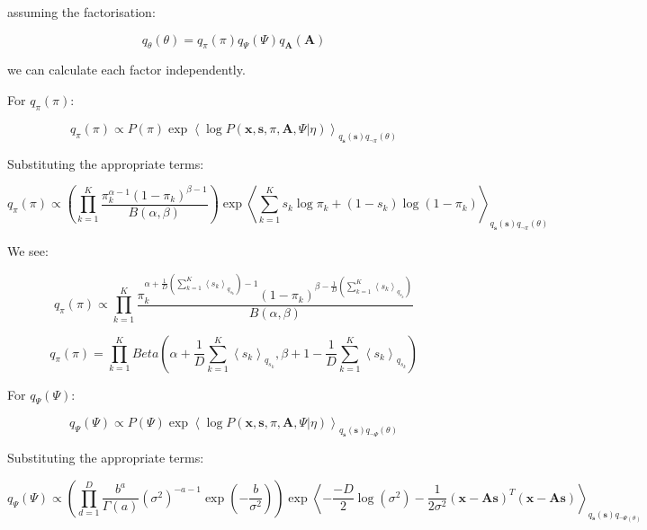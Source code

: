 \documentclass[12pt]{article}
\begin{document}
assuming the factorisation:

\[q_{\theta}(\theta) = q_{\pi}(\pi)q_{\Psi}(\Psi)q_{\textbf{A}}(\textbf{A})\]

we can calculate each factor independently.

For $q_{\pi}(\pi)$:

\[q_{\pi}(\pi) \propto P(\pi)\exp \left\langle \log P(\textbf{x}, \textbf{s}, \pi, \textbf{A}, \Psi | \eta) \right\rangle_{q_{\textbf{s}}(\textbf{s}) q_{\neg \pi}(\theta)}\]

Substituting the appropriate terms:

\[q_{\pi}(\pi) \propto \left(\prod_{k=1}^{K} \frac{\pi_k^{\alpha - 1}(1-\pi_k)^{\beta-1}}{B(\alpha, \beta)} \right)\exp \left\langle \sum_{k=1}^K s_k \log \pi_k + (1 - s_k) \log (1-\pi_k) \right\rangle_{q_{\textbf{s}}(\textbf{s}) q_{\neg \pi}(\theta)}\]

We see:

\[q_{\pi}(\pi) \propto \prod_{k=1}^{K} \frac{\pi_k^{\alpha  + \frac{1}{D}\left(\sum_{k=1}^K \left\langle s_k\right\rangle_{q_{s_k}}\right) - 1}(1-\pi_k)^{\beta-\frac{1}{D}\left(\sum_{k=1}^K \left\langle s_k\right\rangle_{q_{s_k}}\right)}}{B(\alpha, \beta)}\]

\[q_{\pi}(\pi) = \prod_{k=1}^{K}  Beta\left(\alpha + \frac{1}{D}\sum_{k=1}^K \left\langle s_k\right\rangle_{q_{s_k}} , \beta+1- \frac{1}{D}\sum_{k=1}^K \left\langle s_k\right\rangle_{q_{s_k}}\right)\]


%
%
%
%

For $q_{\Psi}(\Psi)$:

\[q_{\Psi}(\Psi) \propto P(\Psi)\exp \left\langle \log P(\textbf{x}, \textbf{s}, \pi, \textbf{A}, \Psi | \eta) \right\rangle_{q_{\textbf{s}}(\textbf{s}) q_{\neg \Psi}(\theta)}\]

Substituting the appropriate terms:

\[
q_{\Psi}(\Psi) \propto \left( \prod_{d=1}^D \frac{b^{a}}{\Gamma(a)}(\sigma^2)^{-a-1}\exp\left(-\frac{b}{\sigma^2}\right) \right)\exp \left\langle   -\frac{-D}{2} \log (\sigma^2)   -\frac{1}{2 \sigma^2} \left(\textbf{x}-\textbf{A}\textbf{s} \right)^T\left(\textbf{x}-\textbf{A}\textbf{s} \right)  \right\rangle_{q_{\textbf{s}}(\textbf{s}) q_{\neg \Psi(\theta)}}
\]
\end{document}
